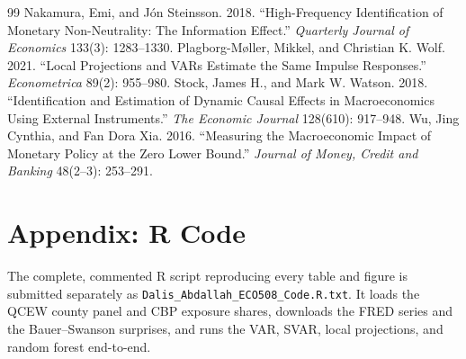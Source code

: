 \documentclass[11pt]{article}
\begin{document}
\begin{thebibliography}{99}
 Nakamura, Emi, and J\'on Steinsson. 2018. ``High-Frequency Identification of Monetary Non-Neutrality: The Information Effect.'' \textit{Quarterly Journal of Economics} 133(3): 1283--1330.
 Plagborg-M\o ller, Mikkel, and Christian K. Wolf. 2021. ``Local Projections and VARs Estimate the Same Impulse Responses.'' \textit{Econometrica} 89(2): 955--980.
 Stock, James H., and Mark W. Watson. 2018. ``Identification and Estimation of Dynamic Causal Effects in Macroeconomics Using External Instruments.'' \textit{The Economic Journal} 128(610): 917--948.
 Wu, Jing Cynthia, and Fan Dora Xia. 2016. ``Measuring the Macroeconomic Impact of Monetary Policy at the Zero Lower Bound.'' \textit{Journal of Money, Credit and Banking} 48(2--3): 253--291.
\end{thebibliography}

\appendix
\section{Appendix: R Code}
The complete, commented R script reproducing every table and figure is submitted separately as
\texttt{Dalis\_Abdallah\_ECO508\_Code.R.txt}. It loads the QCEW county panel and CBP exposure
shares, downloads the FRED series and the Bauer--Swanson surprises, and runs the VAR, SVAR,
local projections, and random forest end-to-end.
\end{document}
